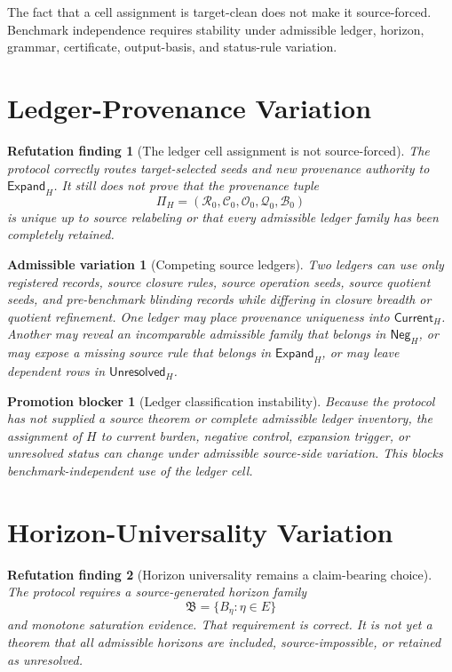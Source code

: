 \documentclass[11pt]{article}
\newcommand{\HorizonFam}{\mathfrak{B}}
\newcommand{\Current}{\mathsf{Current}}
\newcommand{\Neg}{\mathsf{Neg}}
\newcommand{\Expand}{\mathsf{Expand}}
\newcommand{\Unres}{\mathsf{Unresolved}}
\newtheorem{finding}{Refutation finding}
\newtheorem{variation}{Admissible variation}
\newtheorem{blocker}{Promotion blocker}
\begin{document}
The fact that a cell assignment is target-clean does not make it
source-forced. Benchmark independence requires stability under admissible
ledger, horizon, grammar, certificate, output-basis, and status-rule
variation.

\section{Ledger-Provenance Variation}

\begin{finding}[The ledger cell assignment is not source-forced]
The protocol correctly routes target-selected seeds and new provenance
authority to \(\Expand_H\). It still does not prove that the provenance tuple
\[
\Pi_H=(\mathcal{R}_{0},\mathcal{C}_{0},\mathcal{O}_{0},
\mathcal{Q}_{0},\mathcal{B}_{0})
\]
is unique up to source relabeling or that every admissible ledger family has
been completely retained.
\end{finding}

\begin{variation}[Competing source ledgers]
Two ledgers can use only registered records, source closure rules, source
operation seeds, source quotient seeds, and pre-benchmark blinding records
while differing in closure breadth or quotient refinement. One ledger may
place provenance uniqueness into \(\Current_H\). Another may reveal an
incomparable admissible family that belongs in \(\Neg_H\), or may expose a
missing source rule that belongs in \(\Expand_H\), or may leave dependent
rows in \(\Unres_H\).
\end{variation}

\begin{blocker}[Ledger classification instability]
Because the protocol has not supplied a source theorem or complete
admissible ledger inventory, the assignment of \(H\) to current burden,
negative control, expansion trigger, or unresolved status can change under
admissible source-side variation. This blocks benchmark-independent use of
the ledger cell.
\end{blocker}

\section{Horizon-Universality Variation}

\begin{finding}[Horizon universality remains a claim-bearing choice]
The protocol requires a source-generated horizon family
\[
\HorizonFam=\{B_\eta:\eta\in E\}
\]
and monotone saturation evidence. That requirement is correct. It is not yet
a theorem that all admissible horizons are included, source-impossible, or
retained as unresolved.
\end{finding}
\end{document}
